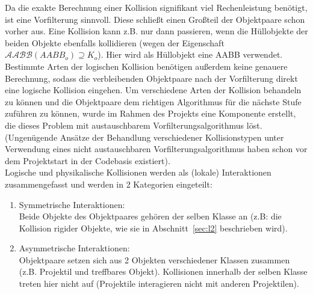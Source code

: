 Da die exakte Berechnung einer Kollision signifikant viel Rechenleistung benötigt, ist eine Vorfilterung sinnvoll. Diese schließt einen Großteil der Objektpaare schon vorher aus. Eine Kollision kann z.B. nur dann passieren, wenn die Hüllobjekte der beiden Objekte ebenfalls kollidieren (wegen der Eigenschaft $\mathcal{AABB}(AABB_o) \supseteq K_o$). Hier wird als Hüllobjekt eine AABB verwendet. Bestimmte Arten der logischen Kollision benötigen außerdem keine genauere Berechnung, sodass die verbleibenden Objektpaare nach der Vorfilterung direkt eine logische Kollision eingehen. Um verschiedene Arten der Kollision behandeln zu können und die Objektpaare dem richtigen Algorithmus für die nächste Stufe zuführen zu können, wurde im Rahmen des Projekts eine Komponente erstellt, die dieses Problem mit austauschbarem Vorfilterungsalgorithmus löst. (Ungenügende Ansätze der Behandlung verschiedener Kollisionstypen unter Verwendung eines nicht austauschbaren Vorfilterungsalgorithmus haben schon vor dem Projektstart in der Codebasis existiert). \\
Logische und physikalische Kollisionen werden als (lokale) Interaktionen zusammengefasst und werden in 2 Kategorien eingeteilt:
\begin{enumerate}
\item Symmetrische Interaktionen:\\
Beide Objekte des Objektpaares gehören der selben Klasse an (z.B: die Kollision rigider Objekte, wie sie in Abschnitt~\ref{sec:l2} beschrieben wird).
\item Asymmetrische Interaktionen:\\
Objektpaare setzen sich aus 2 Objekten verschiedener Klassen zusammen (z.B. Projektil und treffbares Objekt). Kollisionen innerhalb der selben Klasse treten hier nicht auf (Projektile interagieren nicht mit anderen Projektilen).
\end{enumerate}

